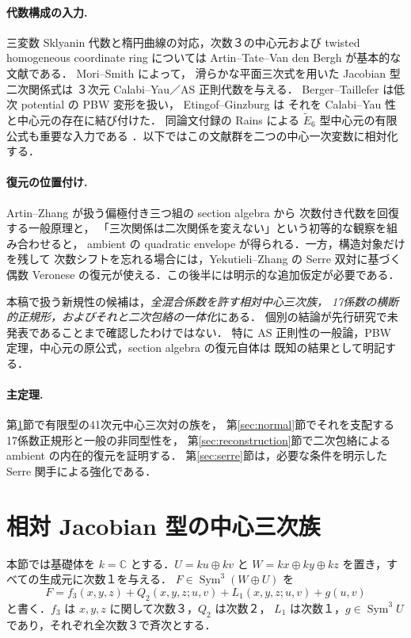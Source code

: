 \documentclass[11pt,a4paper]{ltjsarticle}
\numberwithin{equation}{section}
\newcommand{\C}{\mathbb C}
\newcommand{\Sym}{\operatorname{Sym}}
\begin{document}
\paragraph{代数構成の入力.}
三変数 Sklyanin 代数と楕円曲線の対応，次数３の中心元および
twisted homogeneous coordinate ring については
Artin--Tate--Van den Bergh \cite{ATV} が基本的な文献である．
Mori--Smith \cite[Theorem~4.2(1)]{MS} によって，
滑らかな平面三次式を用いた Jacobian 型二次関係式は
３次元 Calabi--Yau／AS 正則代数を与える．
Berger--Taillefer \cite{BT} は低次 potential の PBW 変形を扱い，
Etingof--Ginzburg \cite[Proposition~7.3.1(ii), Theorem~3.3.2]{EG} は
それを Calabi--Yau 性と中心元の存在に結び付けた．
同論文付録の Rains による $\widetilde E_6$ 型中心元の有限公式も重要な入力である
\cite[\S9.1]{EG}．以下ではこの文献群を二つの中心一次変数に相対化する．

\paragraph{復元の位置付け.}
Artin--Zhang \cite{AZ} が扱う偏極付き三つ組の section algebra から
次数付き代数を回復する一般原理と，
「三次関係は二次関係を変えない」という初等的な観察を組み合わせると，
ambient の quadratic envelope が得られる．一方，構造対象だけを残して
次数シフトを忘れる場合には，Yekutieli--Zhang \cite{YZ} の Serre 双対に基づく
偶数 Veronese の復元が使える．この後半には明示的な追加仮定が必要である．

本稿で扱う新規性の候補は，\emph{全混合係数を許す相対中心三次族，
17係数の横断的正規形，およびそれと二次包絡の一体化}にある．
個別の結論が先行研究で未発表であることまで確認したわけではない．
特に AS 正則性の一般論，PBW 定理，中心元の原公式，section algebra の復元自体は
既知の結果として明記する．

\paragraph{主定理.}
第\ref{sec:construction}節で有限型の41次元中心三次対の族を，
第\ref{sec:normal}節でそれを支配する17係数正規形と一般の非同型性を，
第\ref{sec:reconstruction}節で二次包絡による ambient の内在的復元を証明する．
第\ref{sec:serre}節は，必要な条件を明示した Serre 関手による強化である．

\section{相対 Jacobian 型の中心三次族}\label{sec:construction}
本節では基礎体を $k=\C$ とする．$U=ku\oplus kv$ と
$W=kx\oplus ky\oplus kz$ を置き，すべての生成元に次数１を与える．
$F\in\Sym^3(W\oplus U)$ を
\begin{equation}\label{eq:Ffull}
 F=f_3(x,y,z)+Q_2(x,y,z;u,v)+L_1(x,y,z;u,v)+g(u,v)
\end{equation}
と書く．$f_3$ は $x,y,z$ に関して次数３，$Q_2$ は次数２，
$L_1$ は次数１，$g\in\Sym^3U$ であり，それぞれ全次数３で斉次とする．
\end{document}
